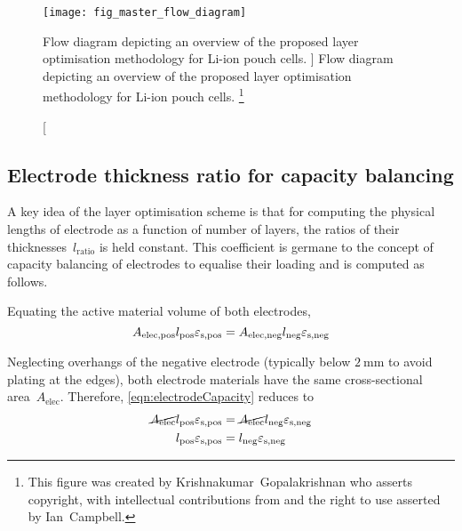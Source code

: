 
\afterpage{\clearpage}

\begin{figure}[p]
    \begin{minipage}[t]{\textwidth}
        \centering
        \texttt{[image: fig\_master\_flow\_diagram]}
        \captionsetup{labelsep=note}
        \caption
        [%
        Flow diagram depicting an overview of the proposed layer optimisation methodology
        for Li-ion pouch cells.
        ]%
        {%
            Flow diagram depicting an overview of the proposed layer optimisation methodology
            for Li-ion pouch cells.
        }%
        \label{fig:fig_strategy_schematic}
        \mpfootnotes[1]
        \vspace*{0.7225cm}
        \footnote{This figure was created by \mbox{Krishnakumar Gopalakrishnan} who
            asserts copyright, with intellectual contributions from and the right to
        use asserted by \mbox{Ian Campbell}.}
    \end{minipage}
\end{figure}

\subsection{Electrode thickness ratio for capacity balancing}\label{sec:electroderatio}

A key  idea of the layer  optimisation scheme is that  for computing the
physical  lengths  of electrode  as  a  function  of number  of  layers,
the  ratios  of  their thicknesses~$l_\text{ratio}$  is  held  constant.
This  coefficient is  germane to  the concept  of capacity  balancing of
electrodes  to equalise  their loading and is computed as follows.

Equating  the active material volume of both electrodes,
\begin{equation}
    A_\text{elec,pos}l_\text{pos}  \varepsilon_\text{s,pos} = A_\text{elec,neg}l_\text{neg}  \varepsilon_\text{s,neg} \label{eqn:electrodeCapacity}\\
\end{equation}

Neglecting  overhangs   of  the  negative  electrode   (typically  below
$\SI{2}{\milli\meter}$ to  avoid plating  at the edges),  both electrode
materials have the same cross-sectional area~$A_\text{elec}$. Therefore,
\cref{eqn:electrodeCapacity} reduces to
\begin{align}
    \cancel{A_\text{elec}}l_\text{pos}  \varepsilon_\text{s,pos} & = \cancel{A_\text{elec}}l_\text{neg}  \varepsilon_\text{s,neg}  \\
    l_\text{pos}  \varepsilon_\text{s,pos}                       & = l_\text{neg}  \varepsilon_\text{s,neg}\label{eqn:electrodeCapequalarea}
\end{align}

